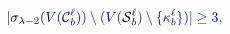 \documentclass[12pt]{article}
\begin{document}
\makeatletter
\renewcommand*{\@textcolor}[3]{%
  \protect\leavevmode
  \begingroup
    \color#1{#2}#3%
  \endgroup
}
\makeatother
\begin{displaymath}
\mathcolor[RGB]{0,0,15}{|} \mathcolor[RGB]{0,0,30}{\sigma} _ { \mathcolor[RGB]{0,0,45}{\lambda} \mathcolor[RGB]{0,0,60}{-} \mathcolor[RGB]{0,0,75}{2} } \mathcolor[RGB]{0,0,90}{(} \mathcolor[RGB]{0,0,105}{V} \mathcolor[RGB]{0,0,120}{(} \mathcal { \mathcolor[RGB]{0,0,135}{C} } _ { \mathcolor[RGB]{0,0,150}{b} } ^ { \mathcolor[RGB]{0,0,165}{\ell} } \mathcolor[RGB]{0,0,180}{)} \mathcolor[RGB]{0,0,195}{)} \mathcolor[RGB]{0,0,210}{\setminus} \mathcolor[RGB]{0,0,225}{(} \mathcolor[RGB]{0,0,240}{V} \mathcolor[RGB]{0,0,255}{(} \mathcal { \mathcolor[RGB]{0,15,0}{S} } _ { \mathcolor[RGB]{0,15,15}{b} } ^ { \mathcolor[RGB]{0,15,30}{\ell} } \mathcolor[RGB]{0,15,45}{)} \mathcolor[RGB]{0,15,60}{\setminus} \mathcolor[RGB]{0,15,75}{\{} \mathcolor[RGB]{0,15,90}{\kappa} _ { \mathcolor[RGB]{0,15,105}{b} } ^ { \mathcolor[RGB]{0,15,120}{\ell} } \mathcolor[RGB]{0,15,135}{\}} \mathcolor[RGB]{0,15,150}{)} \mathcolor[RGB]{0,15,165}{|} \mathcolor[RGB]{0,15,180}{\geq} \mathcolor[RGB]{0,15,195}{3} \mathcolor[RGB]{0,15,210}{,}
\end{displaymath}
\end{document}
